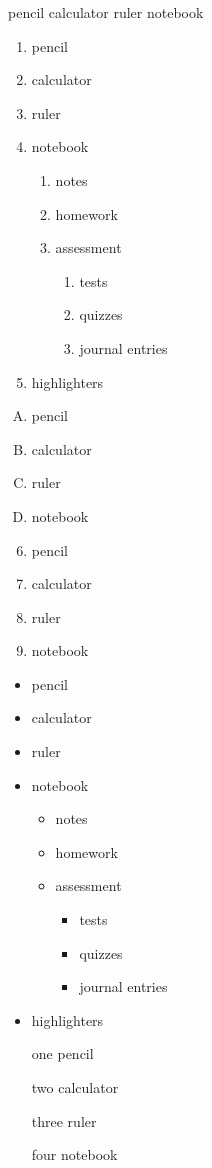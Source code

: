 \documentclass[11pt]{article}
\begin{document}
pencil
calculator 
ruler 
notebook


\begin{enumerate}
 \item pencil
 \item calculator
 \item ruler
 \item notebook
	\begin{enumerate}
	 \item notes
	 \item homework
	 \item assessment
		\begin{enumerate}
		\item tests
		\item quizzes
		\item journal entries
		\end{enumerate}
	\end{enumerate}
 \item highlighters
\end{enumerate}

\vspace{1cm}

\begin{enumerate}[A.]
 \item pencil
 \item calculator
 \item ruler
 \item notebook
\end{enumerate}

\vspace{1cm}

\begin{enumerate} \setcounter{enumi}{5}
 \item pencil
 \item calculator
 \item ruler
 \item notebook
\end{enumerate}

\pagebreak

\begin{itemize}
 \item pencil
 \item calculator
 \item ruler
 \item notebook
	\begin{itemize}
	 \item notes
	 \item homework
	 \item assessment
		\begin{itemize}
		\item tests
		\item quizzes
		\item journal entries
		\end{itemize}
	\end{itemize}
 \item highlighters
\end{itemize}

\vspace{1cm}

\begin{enumerate}
 \item[one] pencil
 \item[two] calculator
 \item[three] ruler
 \item[four] notebook
\end{enumerate}
\end{document}
